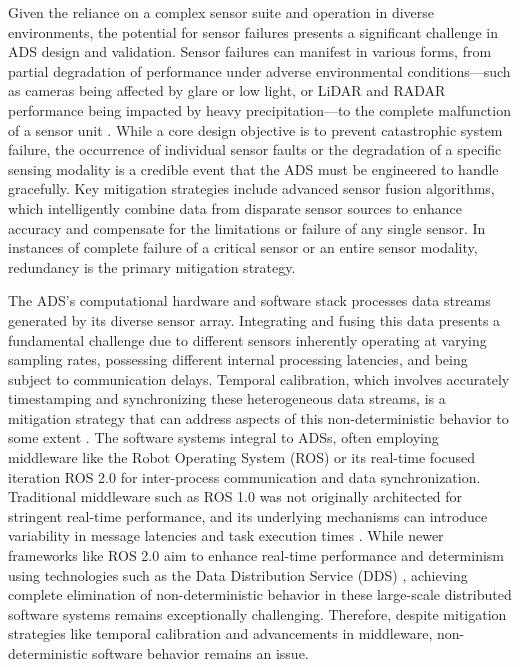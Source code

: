 Given the reliance on a complex sensor suite and operation in diverse environments, the potential for sensor failures presents a significant challenge in ADS design and validation. Sensor failures can manifest in various forms, from partial degradation of performance under adverse environmental conditions—such as cameras being affected by glare or low light, or LiDAR and RADAR performance being impacted by heavy precipitation—to the complete malfunction of a sensor unit \cite{matosSurveySensorFailures2024}. While a core design objective is to prevent catastrophic system failure, the occurrence of individual sensor faults or the degradation of a specific sensing modality is a credible event that the ADS must be engineered to handle gracefully. Key mitigation strategies include advanced sensor fusion algorithms, which intelligently combine data from disparate sensor sources to enhance accuracy and compensate for the limitations or failure of any single sensor. In instances of complete failure of a critical sensor or an entire sensor modality, redundancy is the primary mitigation strategy.

The ADS's computational hardware and software stack processes data streams generated by its diverse sensor array. Integrating and fusing this data presents a fundamental challenge due to different sensors inherently operating at varying sampling rates, possessing different internal processing latencies, and being subject to communication delays. Temporal calibration, which involves accurately timestamping and synchronizing these heterogeneous data streams, is a mitigation strategy that can address aspects of this non-deterministic behavior to some extent \cite{matosSurveySensorFailures2024}. The software systems integral to ADSs, often employing middleware like the Robot Operating System (ROS) or its real-time focused iteration ROS 2.0 for inter-process communication and data synchronization. Traditional middleware such as ROS 1.0 was not originally architected for stringent real-time performance, and its underlying mechanisms can introduce variability in message latencies and task execution times \cite{parkRealTimeCharacteristicsROS2020}. While newer frameworks like ROS 2.0 aim to enhance real-time performance and determinism using technologies such as the Data Distribution Service (DDS) \cite{parkRealTimeCharacteristicsROS2020}, achieving complete elimination of non-deterministic behavior in these large-scale distributed software systems remains exceptionally challenging. Therefore, despite mitigation strategies like temporal calibration and advancements in middleware, non-deterministic software behavior remains an issue.


